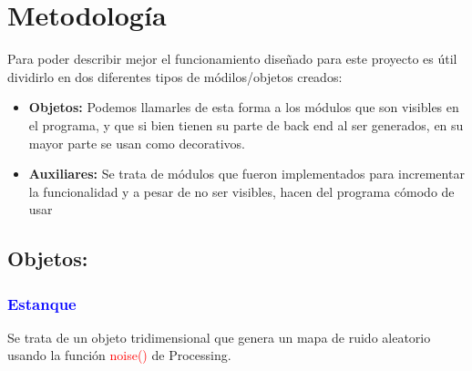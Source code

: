 \documentclass[11pt,a4paper]{article}
\begin{document}
\section{Metodología}
	Para poder describir mejor el funcionamiento diseñado para este proyecto es útil dividirlo en dos diferentes tipos de módilos/objetos creados:
	\begin{itemize}
	\item {\bf Objetos:} Podemos llamarles de esta forma a los módulos que son visibles en el programa, y que si bien tienen su parte de back end al ser generados, en su mayor parte se usan como decorativos.
	\item { \bf Auxiliares: } Se trata de módulos que fueron implementados para incrementar la funcionalidad y a pesar de no ser visibles, hacen del programa cómodo de usar
	\end{itemize}
	\subsection{Objetos: }
		\subsubsection{\textcolor{blue}{Estanque}}
			
			Se trata de un objeto tridimensional que genera un mapa de ruido aleatorio usando la función \textcolor{red}{noise()} de Processing. 
\end{document}
